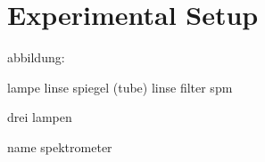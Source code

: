 \section{Experimental Setup}



abbildung:

lampe
linse
spiegel
(tube)
linse
filter
spm

drei lampen


name spektrometer

